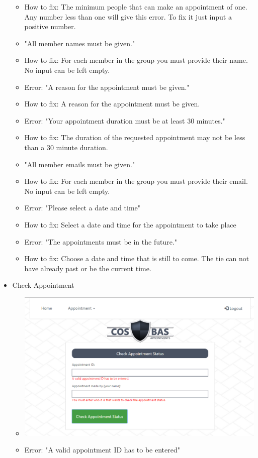 \begin{itemize}
\begin{itemize}
				\item How to fix: The minimum people that can make an appointment of one. Any number less than one will give this error. To fix it just input a positive number. 
				\item "All member names must be given."
				\item How to fix: For each member in the group you must provide their name. No input can be left empty.
				\item Error: "A reason for the appointment must be given."
				\item How to fix: A reason for the appointment must be given.
				\item Error: "Your appointment duration must be at least 30 minutes."
				\item How to fix: The duration of the requested appointment may not be less than a 30 minute duration.
				\item "All member emails must be given."
				\item How to fix: For each member in the group you must provide their email. No input can be left empty.
				\item Error: "Please select a date and time"
				\item How to fix: Select a date and time for the appointment to take place
				\item Error: "The appointments must be in the future."
				\item How to fix: Choose a date and time that is still to come. The tie can not have already past or be the current time.
			\end{itemize}
		\item Check Appointment
			\begin{itemize}
				\item \includegraphics[width=\linewidth]{images/Screenshots/CheckAppoint_Errors.png}								\item Error: "A valid appointment ID has to be entered"

\end{itemize}
\end{itemize}
